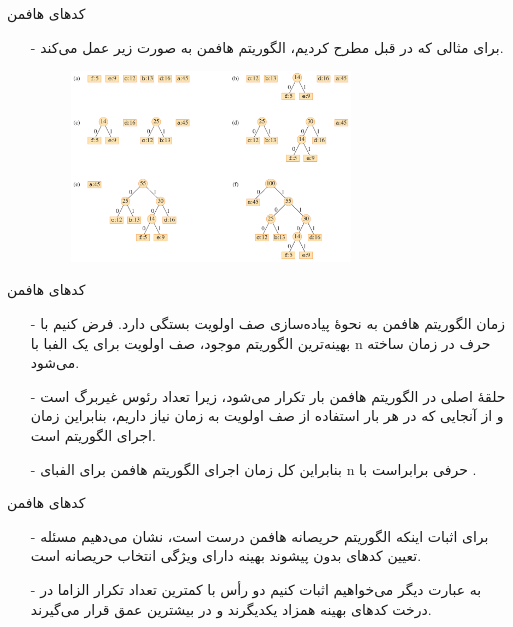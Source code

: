 \begin{frame}{‌کدهای هافمن}
\begin{itemize}\itemr
\item[-]
برای مثالی که در قبل مطرح کردیم، الگوریتم هافمن به صورت زیر عمل می‌کند.
\begin{figure}
\includegraphics[width=0.7\textwidth]{figs/chap05/huffman-alg-ex}
\end{figure}
\end{itemize}
\end{frame}


\begin{frame}{‌کدهای هافمن}
\begin{itemize}\itemr
\item[-]
زمان الگوریتم هافمن به نحوهٔ پیاده‌سازی صف اولویت بستگی دارد. فرض کنیم با بهینه‌ترین الگوریتم موجود، صف اولویت برای یک الفبا با n حرف در زمان
ساخته می‌شود.
\item[-]
حلقهٔ اصلی در الگوریتم هافمن
بار تکرار می‌شود، زیرا تعداد رئوس غیربرگ
است
 و از آنجایی که در هر بار استفاده از صف اولویت به زمان
نیاز داریم، بنابراین زمان اجرای الگوریتم
است.
\item[-]
بنابراین کل زمان اجرای الگوریتم هافمن برای الفبای n حرفی برابراست با
.
\end{itemize}
\end{frame}


\begin{frame}{‌کدهای هافمن}
\begin{itemize}\itemr
\item[-]
برای اثبات اینکه الگوریتم حریصانه هافمن درست است، نشان می‌دهیم مسئله تعیین کدهای بدون پیشوند بهینه دارای ویژگی انتخاب حریصانه است.
\item[-]
به عبارت دیگر می‌خواهیم اثبات کنیم دو رأس با کمترین تعداد تکرار الزاما در درخت کدهای بهینه همزاد یکدیگرند و در بیشترین عمق قرار می‌گیرند.
\end{itemize}
\end{frame}


